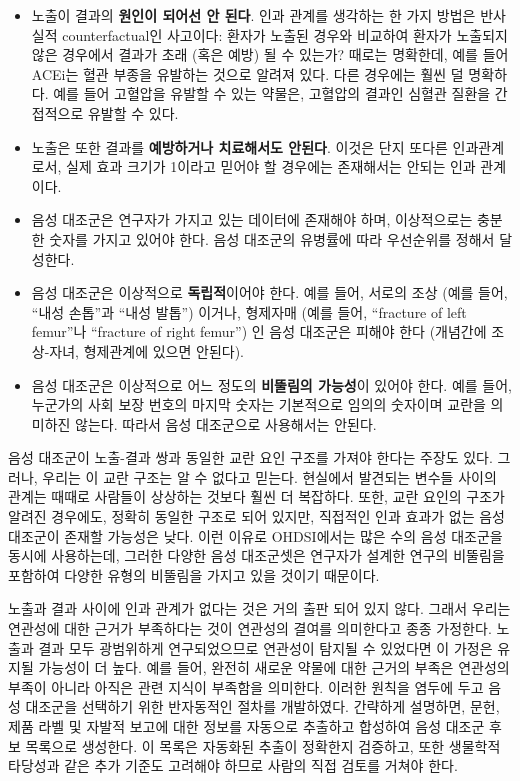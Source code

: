 \documentclass[10.5pt]{book}
\providecommand{\tightlist}{%
  \setlength{\itemsep}{0pt}\setlength{\parskip}{0pt}}
\theoremstyle{definition}
\theoremstyle{definition}
\theoremstyle{definition}
\theoremstyle{remark}
\begin{document}
\begin{itemize}
\tightlist
\item
  노출이 결과의 \textbf{원인이 되어선 안 된다}. 인과 관계를 생각하는 한
  가지 방법은 반사실적 counterfactual인 사고이다: 환자가 노출된 경우와
  비교하여 환자가 노출되지 않은 경우에서 결과가 초래 (혹은 예방) 될 수
  있는가? 때로는 명확한데, 예를 들어 ACEi는 혈관 부종을 유발하는 것으로
  알려져 있다. 다른 경우에는 훨씬 덜 명확하다. 예를 들어 고혈압을 유발할
  수 있는 약물은, 고혈압의 결과인 심혈관 질환을 간접적으로 유발할 수
  있다.
\item
  노출은 또한 결과를 \textbf{예방하거나 치료해서도 안된다}. 이것은 단지
  또다른 인과관계로서, 실제 효과 크기가 1이라고 믿어야 할 경우에는
  존재해서는 안되는 인과 관계이다.
\item
  음성 대조군은 연구자가 가지고 있는 데이터에 존재해야 하며,
  이상적으로는 충분한 숫자를 가지고 있어야 한다. 음성 대조군의 유병률에
  따라 우선순위를 정해서 달성한다.
\item
  음성 대조군은 이상적으로 \textbf{독립적}이어야 한다. 예를 들어, 서로의
  조상 (예를 들어, ``내성 손톱''과 ``내성 발톱'') 이거나, 형제자매 (예를
  들어, ``fracture of left femur''나 ``fracture of right femur'') 인
  음성 대조군은 피해야 한다 (개념간에 조상-자녀, 형제관계에 있으면
  안된다).
\item
  음성 대조군은 이상적으로 어느 정도의 \textbf{비뚤림의 가능성}이 있어야
  한다. 예를 들어, 누군가의 사회 보장 번호의 마지막 숫자는 기본적으로
  임의의 숫자이며 교란을 의미하진 않는다. 따라서 음성 대조군으로
  사용해서는 안된다.
\end{itemize}

음성 대조군이 노출-결과 쌍과 동일한 교란 요인 구조를 가져야 한다는
주장도 있다. \citep{lipsitch_2010} 그러나, 우리는 이 교란 구조는 알 수
없다고 믿는다. 현실에서 발견되는 변수들 사이의 관계는 때때로 사람들이
상상하는 것보다 훨씬 더 복잡하다. 또한, 교란 요인의 구조가 알려진
경우에도, 정확히 동일한 구조로 되어 있지만, 직접적인 인과 효과가 없는
음성 대조군이 존재할 가능성은 낮다. 이런 이유로 OHDSI에서는 많은 수의
음성 대조군을 동시에 사용하는데, 그러한 다양한 음성 대조군셋은 연구자가
설계한 연구의 비뚤림을 포함하여 다양한 유형의 비뚤림을 가지고 있을
것이기 때문이다.

노출과 결과 사이에 인과 관계가 없다는 것은 거의 출판 되어 있지 않다.
그래서 우리는 연관성에 대한 근거가 부족하다는 것이 연관성의 결여를
의미한다고 종종 가정한다. 노출과 결과 모두 광범위하게 연구되었으므로
연관성이 탐지될 수 있었다면 이 가정은 유지될 가능성이 더 높다. 예를
들어, 완전히 새로운 약물에 대한 근거의 부족은 연관성의 부족이 아니라
아직은 관련 지식이 부족함을 의미한다. 이러한 원칙을 염두에 두고 음성
대조군을 선택하기 위한 반자동적인 절차를 개발하였다. \citep{voss_2016}
간략하게 설명하면, 문헌, 제품 라벨 및 자발적 보고에 대한 정보를 자동으로
추출하고 합성하여 음성 대조군 후보 목록으로 생성한다. 이 목록은 자동화된
추출이 정확한지 검증하고, 또한 생물학적 타당성과 같은 추가 기준도
고려해야 하므로 사람의 직접 검토를 거쳐야 한다.
\end{document}

